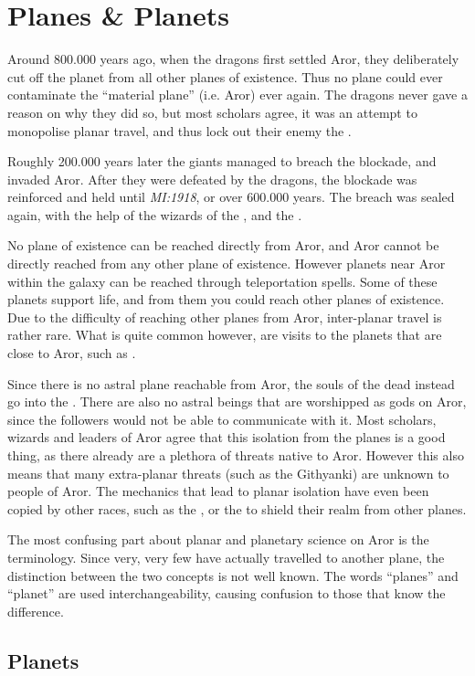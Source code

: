 \chapter{Planes \& Planets}
\label{sec:Planes}

Around 800.000 years ago, when the dragons first settled Aror, they
deliberately cut off the planet from all other planes of existence. Thus no
plane could ever contaminate the ``material plane'' (i.e. Aror) ever
again. The dragons never gave a reason on why they did so, but most scholars
agree, it was an attempt to monopolise planar travel, and thus lock out their
enemy the .

Roughly 200.000 years later the giants managed to breach the blockade, and
invaded Aror. After they were defeated by the dragons, the blockade was
reinforced and held until \emph{MI:1918}, or over 600.000 years. The breach
was sealed again, with the help of the wizards of the , and the .

No plane of existence can be reached directly from Aror, and Aror cannot be
directly reached from any other plane of existence. However planets near Aror
within the galaxy can be reached through teleportation spells. Some of these
planets support life, and from them you could reach other planes of existence.
Due to the difficulty of reaching other planes from Aror, inter-planar travel
is rather rare. What is quite common however, are visits to the planets that
are close to Aror, such as .

Since there is no astral plane reachable from Aror, the souls of the dead
instead go into the . There are also no astral beings
that are worshipped as gods on Aror, since the followers would not be able to
communicate with it. Most scholars, wizards and leaders of Aror agree that
this isolation from the planes is a good thing, as there already are a
plethora of threats native to Aror. However this also means that many
extra-planar threats (such as the Githyanki) are unknown to people of Aror.
The mechanics that lead to planar isolation have even been copied by other
races, such as the , or the  to
shield their realm from other planes.

The most confusing part about planar and planetary science on Aror is the
terminology. Since very, very few have actually travelled to another plane,
the distinction between the two concepts is not well known. The words
``planes'' and ``planet'' are used interchangeability, causing confusion to
those that know the difference.


\section{Planets}


